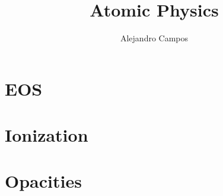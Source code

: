 \documentclass[a4paper,11pt]{report}
\title{Atomic Physics}
\author{Alejandro Campos}
\begin{document}
\maketitle
\tableofcontents

\chapter{EOS}

\chapter{Ionization}

\chapter{Opacities}
\end{document}
